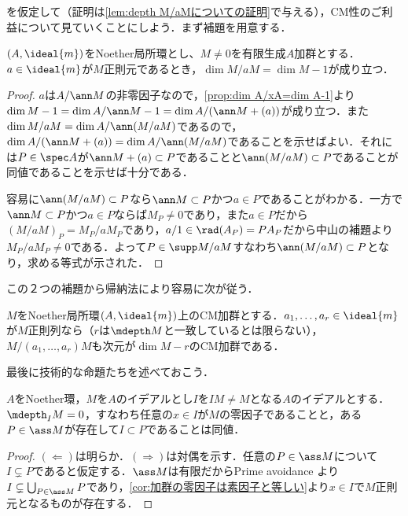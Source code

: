 を仮定して（証明は\ref{lem:depth M/aMについての証明}で与える），CM性のご利益について見ていくことにしよう．まず補題を用意する．

\begin{lem}\label{lem:dim M/aM=dim M-1}
	$(A,\ideal{m})$をNoether局所環とし、$M\neq0$を有限生成$A$加群とする．$a\in\ideal{m}$が$M$正則元であるとき，$\dim M/aM=\dim M-1$が成り立つ．
\end{lem}

\begin{proof}
	$a$は$A/\ann M$の非零因子なので，\ref{prop:dim A/xA=dim A-1}より$\dim M-1=\dim A/\ann M-1=\dim A/(\ann M+(a))$が成り立つ．また$\dim M/aM=\dim A/\ann(M/aM)$であるので，$\dim A/(\ann M+(a))=\dim A/\ann(M/aM)$であることを示せばよい．それには$P\in\spec A$が$\ann M+(a)\subset P$であることと$\ann(M/aM)\subset P$であることが同値であることを示せば十分である．
	
	容易に$\ann(M/aM)\subset P$なら$\ann M\subset P$かつ$a\in P$であることがわかる．一方で$\ann M\subset P$かつ$a\in P$ならば$M_P\neq0$であり，また$a\in P$だから$(M/aM)_P=M_P/aM_P$であり，$a/1\in\rad (A_P)=PA_P$だから中山の補題より$M_P/aM_P\neq0$である．よって$P\in\supp M/aM$すなわち$\ann(M/aM)\subset P$となり，求める等式が示された．
\end{proof}

この２つの補題から帰納法により容易に次が従う．
\begin{cor}\label{cor:CMの正則列による商もCM}
	$M$をNoether局所環$(A,\ideal{m})$上のCM加群とする．$a_1,\dots,a_r\in\ideal{m}$が$M$正則列なら（$r$は$\mdepth M$と一致しているとは限らない），$M/(a_1,\dots,a_r)M$も次元が$\dim M-r$のCM加群である．
\end{cor}

最後に技術的な命題たちを述べておこう．

\begin{lem}\label{lem:depth 0とass}
	$A$をNoether環，$M$を$A$のイデアルとし$I$を$IM\neq M$となる$A$のイデアルとする．$\mdepth_I M=0$，すなわち任意の$x\in I$が$M$の零因子であることと，ある$P\in\ass M$が存在して$I\subset P$であることは同値．
\end{lem}

\begin{proof}
	$(\Longleftarrow)$は明らか．$(\Longrightarrow)$は対偶を示す．任意の$P\in\ass M$について$I\subsetneq P$であると仮定する．$\ass M$は有限だからPrime avoidance より$I\subsetneq\bigcup_{P\in\ass M}P$であり，\ref{cor:加群の零因子は素因子と等しい}より$x\in I$で$M$正則元となるものが存在する．
\end{proof}

